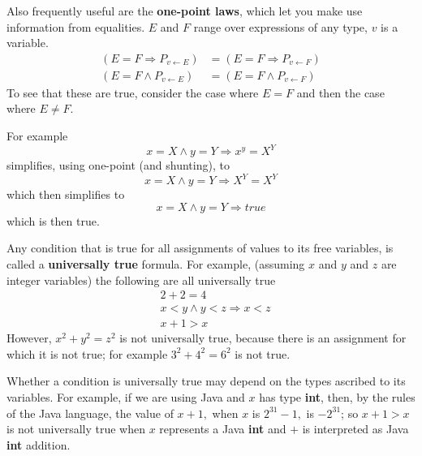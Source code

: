 \documentclass[11pt]{article}%
\begin{document}
Also frequently useful are the \textbf{one-point laws}, which let you make use
information from equalities. $E$ and $F$ range over expressions of any type,
$v$ is a variable.
\begin{align*}
\left(  E=F\Rightarrow P_{v\leftarrow E}\right)   &  =\left(  E=F\Rightarrow
P_{v\leftarrow F}\right) \\
\left(  E=F\wedge P_{v\leftarrow E}\right)   &  =\left(  E=F\wedge
P_{v\leftarrow F}\right)
\end{align*}
To see that these are true, consider the case where $E=F$ and then the case
where $E\neq F$.

For example%
\[
x=X\wedge y=Y\Rightarrow x^{y}=X^{Y}%
\]
simplifies, using one-point (and shunting), to%
\[
x=X\wedge y=Y\Rightarrow X^{Y}=X^{Y}%
\]
which then simplifies to%
\[
x=X\wedge y=Y\Rightarrow\mathit{true}%
\]
which is then true.

Any condition that is true for all assignments of values to its free
variables, is called a \textbf{universally true} formula. For example,
(assuming $x$ and $y$ and $z$ are integer variables) the following are all
universally true%
\begin{align*}
&  \left.  2+2=4\right. \\
&  \left.  x<y\wedge y<z\Rightarrow x<z\right. \\
&  \left.  x+1>x\right.
\end{align*}
However, $x^{2}+y^{2}=z^{2}$ is not universally true, because there is an
assignment for which it is not true; for example $3^{2}+4^{2}=6^{2}$ is not true.

Whether a condition is universally true may depend on the types ascribed to
its variables. For example, if we are using Java and $x$ has type
\textbf{int}, then, by the rules of the Java language, the value of $x+1,$
when $x$ is $2^{31}-1,$ is $-2^{31}$; so $x+1>x$ is not universally true when
$x$ represents a Java \textbf{int} and $+$ is interpreted as Java \textbf{int} addition.

\begin{comment}
    Note that Dafny uses short circuiting three valued logic, so it might be a good idea to change POL to
    do the same.
\end{comment}
\end{document}
